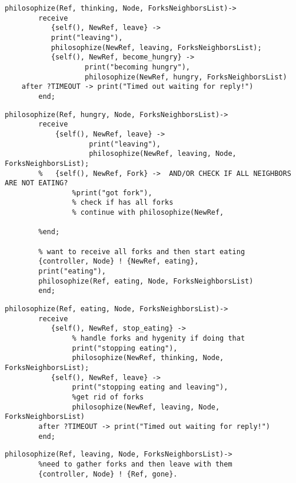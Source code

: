 \documentclass[11pt]{article}
\begin{document}
\begin{lstlisting}
philosophize(Ref, thinking, Node, ForksNeighborsList)->
        receive
           {self(), NewRef, leave} ->
           print("leaving"),
           philosophize(NewRef, leaving, ForksNeighborsList);
           {self(), NewRef, become_hungry} ->
                   print("becoming hungry"),
                   philosophize(NewRef, hungry, ForksNeighborsList)
	after ?TIMEOUT -> print("Timed out waiting for reply!")
        end;
\end{lstlisting}

\begin{lstlisting}
philosophize(Ref, hungry, Node, ForksNeighborsList)->
        receive
            {self(), NewRef, leave} ->
                    print("leaving"),
                    philosophize(NewRef, leaving, Node, ForksNeighborsList);
        %   {self(), NewRef, Fork} ->  AND/OR CHECK IF ALL NEIGHBORS ARE NOT EATING?
                %print("got fork"),
                % check if has all forks
                % continue with philosophize(NewRef, 

        %end;

        % want to receive all forks and then start eating
        {controller, Node} ! {NewRef, eating},
        print("eating"),
        philosophize(Ref, eating, Node, ForksNeighborsList)
        end;
\end{lstlisting}
\begin{lstlisting}
philosophize(Ref, eating, Node, ForksNeighborsList)->
        receive
           {self(), NewRef, stop_eating} ->
                % handle forks and hygenity if doing that
                print("stopping eating"),
                philosophize(NewRef, thinking, Node, ForksNeighborsList);
           {self(), NewRef, leave} ->
                print("stopping eating and leaving"),
                %get rid of forks
                philosophize(NewRef, leaving, Node, ForksNeighborsList)
        after ?TIMEOUT -> print("Timed out waiting for reply!")
        end;
\end{lstlisting}

\begin{lstlisting}
philosophize(Ref, leaving, Node, ForksNeighborsList)->
        %need to gather forks and then leave with them
        {controller, Node} ! {Ref, gone}.
\end{lstlisting}
\end{document}
